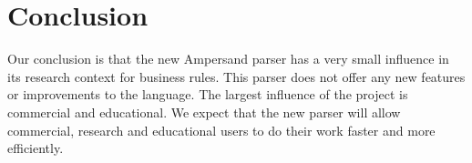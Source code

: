 
\section{Conclusion}
\label{sec:conclusion}
Our conclusion is that the new Ampersand parser has a very small influence in its research context for business rules.
This parser does not offer any new features or improvements to the language.
The largest influence of the project is commercial and educational.
We expect that the new parser will allow commercial, research and educational users to do their work faster and more efficiently.
